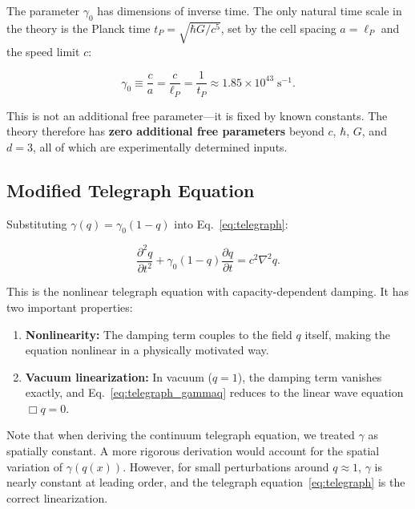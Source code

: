 \documentclass[aps,prd,twocolumn,showpacs,superscriptaddress,preprintnumbers]{revtex4-2}
\begin{document}
The parameter $\gamma_0$ has dimensions of inverse time.
The only natural time scale in the theory is the Planck time $t_P=\sqrt{\hbar G/c^5}$, set by the cell spacing $a=\ell_P$ and the speed limit $c$:

\begin{equation}
\gamma_0 \equiv \frac{c}{a} = \frac{c}{\ell_P} = \frac{1}{t_P} \approx 1.85 \times 10^{43}\;\text{s}^{-1}.
\label{eq:gamma0}
\end{equation}

This is not an additional free parameter---it is fixed by known constants.
The theory therefore has \textbf{zero additional free parameters} beyond $c$, $\hbar$, $G$, and $d=3$, all of which are experimentally determined inputs.

\subsection{Modified Telegraph Equation}

Substituting $\gamma(q)=\gamma_0(1-q)$ into Eq.~\eqref{eq:telegraph}:

\begin{equation}
\boxed{\frac{\partial^2 q}{\partial t^2} + \gamma_0(1-q)\frac{\partial q}{\partial t} = c^2 \nabla^2 q}.
\label{eq:telegraph_gammaq}
\end{equation}

This is the nonlinear telegraph equation with capacity-dependent damping.
It has two important properties:

\begin{enumerate}
    \item \textbf{Nonlinearity:} The damping term couples to the field $q$ itself, making the equation nonlinear in a physically motivated way.
    \item \textbf{Vacuum linearization:} In vacuum ($q=1$), the damping term vanishes exactly, and Eq.~\eqref{eq:telegraph_gammaq} reduces to the linear wave equation $\Box q=0$.
\end{enumerate}

Note that when deriving the continuum telegraph equation, we treated $\gamma$ as spatially constant.
A more rigorous derivation would account for the spatial variation of $\gamma(q(x))$.
However, for small perturbations around $q\approx1$, $\gamma$ is nearly constant at leading order, and the telegraph equation~\eqref{eq:telegraph} is the correct linearization.

\end{document}
